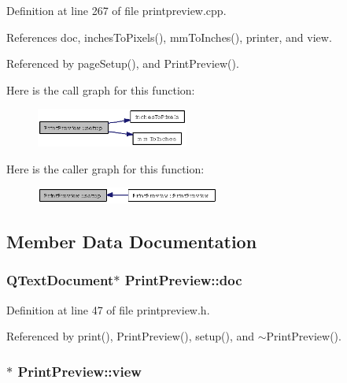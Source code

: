 Definition at line 267 of file printpreview.cpp.

References doc, inches\-To\-Pixels(), mm\-To\-Inches(), printer, and view.

Referenced by page\-Setup(), and Print\-Preview().

Here is the call graph for this function:\begin{figure}[H]
\begin{center}
\leavevmode
\includegraphics[width=142pt]{classPrintPreview_040afcf971a6697122e68ad30ff1a6b2_cgraph}
\end{center}
\end{figure}


Here is the caller graph for this function:\begin{figure}[H]
\begin{center}
\leavevmode
\includegraphics[width=171pt]{classPrintPreview_040afcf971a6697122e68ad30ff1a6b2_icgraph}
\end{center}
\end{figure}


\subsection{Member Data Documentation}
\subsubsection{\setlength{\rightskip}{0pt plus 5cm}QText\-Document$\ast$ {\bf Print\-Preview::doc}\hspace{0.3cm}{\tt  [private]}}\label{classPrintPreview_3570ca427426716c40edafcbf4e5d11a}




Definition at line 47 of file printpreview.h.

Referenced by print(), Print\-Preview(), setup(), and $\sim$Print\-Preview().
\subsubsection{$\ast$ {\bf Print\-Preview::view}\hspace{0.3cm}{\tt  [private]}}\label{classPrintPreview_53a172954bc17804de86086563ddf1e4}




